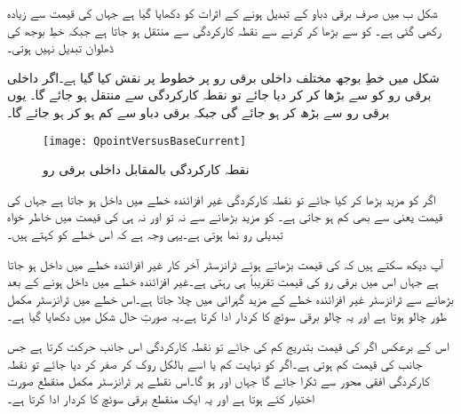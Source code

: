 شکل  ب میں صرف برقی دباو  کے تبدیل ہونے کے اثرات کو دکھایا گیا ہے جہاں  کی قیمت  سے زیادہ رکھی گئی ہے۔  کو   سے بڑھا کر   کرنے سے نقطہ کارکردگی  سے  منتقل ہو جاتا ہے جبکہ خطِ بوجھ کی ڈھلوان تبدیل نہیں ہوتی۔

شکل   میں خطِ بوجھ مختلف داخلی برقی رو  پر   خطوط پر نقش کیا گیا ہے۔اگر داخلی برقی رو کو  سے بڑھا کر   کر دیا جائے تو نقطہ کارکردگی  سے  منتقل ہو جائے گا۔ یوں برقی رو  سے بڑھ کر  ہو جائے گی جبکہ برقی دباو  سے کم ہو کر    ہو جائے گا۔
\begin{figure}
\centering
\texttt{[image: QpointVersusBaseCurrent]}
\caption{نقطہ کارکردگی بالمقابل داخلی برقی رو}
\label{شکل_نکتہ_کارکردگی_بالمقابل_داخلی_برقی_رو}
\end{figure}
اگر  کو مزید بڑھا کر  کیا جائے تو نقطہ کارکردگی غیر افزائندہ خطے میں داخل ہو جاتا ہے جہاں  کی قیمت   یعنی  سے بھی کم ہو جاتی ہے۔  کو مزید بڑھانے سے نہ تو  اور نہ ہی  کی قیمت میں خاطر خواہ تبدیلی رو نما ہوتی ہے۔یہی وجہ ہے کہ اس خطے کو   کہتے ہیں۔

آپ دیکھ سکتے ہیں کہ  کی قیمت بڑھاتے ہوئے ٹرانزسٹر آخر کار غیر افزائندہ خطے میں داخل ہو جاتا ہے جہاں اس میں برقی رو  کی قیمت تقریباً  ہی رہتی ہے۔غیر افزائندہ خطے میں داخل ہونے کے بعد  بڑھانے سے ٹرانزسٹر غیر افزائندہ خطے کے مزید گہرائی میں چلا جاتا ہے۔اس خطے میں ٹرانزسٹر مکمل طور چالو ہوتا ہے اور یہ چالو برقی سوئچ کا کردار ادا کرتا ہے۔یہ صورتِ حال شکل  میں دکھایا گیا ہے۔ 

اس کے برعکس اگر   کی قیمت بتدریج کم کی جائے تو نقطہ کارکردگی اس جانب حرکت کرتا ہے جس جانب   کی قیمت کم ہوتی ہے۔اگر  کو نہایت کم یا اسے بالکل روک کر صفر کر دیا جائے تو نقطہ کارکردگی افقی محور سے ٹکرا جائے گا جہاں  اور  ہو گا۔اس نقطے پر ٹرانزسٹر مکمل منقطع صورت اختیار کئے ہوتا ہے اور یہ ایک منقطع برقی سوئچ کا کردار ادا کرتا ہے۔

